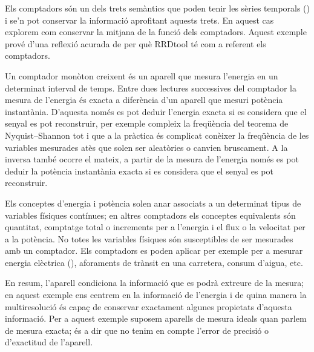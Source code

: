 Els comptadors són un dels trets semàntics que poden tenir les sèries
temporals () i se'n pot conservar la
informació aprofitant aquests trets. En aquest cas explorem com
conservar la mitjana de la funció dels comptadors.  Aquest exemple
prové d'una reflexió acurada de per què RRDtool té com a referent els
comptadors.




Un comptador monòton creixent és un aparell que mesura l'energia en un
determinat interval de temps. Entre dues lectures successives del
comptador la mesura de l'energia és exacta a diferència d'un aparell
que mesuri potència instantània. D'aquesta només es pot deduir
l'energia exacta si es considera que el senyal es pot reconstruir, per
exemple compleix la freqüència del teorema de Nyquist–Shannon tot i
que a la pràctica és complicat conèixer la freqüència de les variables
mesurades atès que solen ser aleatòries o canvien bruscament. A la
inversa també ocorre el mateix, a partir de la mesura de l'energia
només es pot deduir la potència instantània exacta si es considera que
el senyal es pot reconstruir.  


Els conceptes d'energia i potència solen anar associats a un
determinat tipus de variables físiques contínues; en altres comptadors
els conceptes equivalents són quantitat, comptatge total o increments
per a l'energia i el flux o la velocitat per a la potència.  No totes
les variables físiques són susceptibles de ser mesurades amb un
comptador. Els comptadors es poden aplicar per exemple per a mesurar
energia elèctrica (),
aforaments de trànsit en una carretera, consum d'aigua, etc.




  En resum, l'aparell condiciona la informació que es podrà extreure
  de la mesura; en aquest exemple ens centrem en la informació de
  l'energia i de quina manera la multiresolució és capaç de conservar
  exactament algunes propietats d'aquesta informació.  Per a aquest
  exemple suposem aparells de mesura ideals quan parlem de mesura
  exacta; és a dir que no tenim en compte l'error de precisió o
  d'exactitud de l'aparell.

